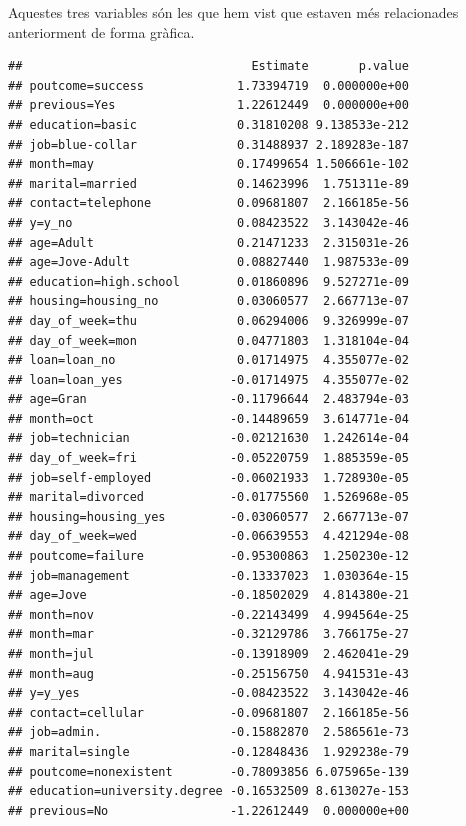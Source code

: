 \documentclass[
]{article}
\newenvironment{Shaded}{\begin{snugshade}}{\end{snugshade}}
\newcommand{\AttributeTok}[1]{\textcolor[rgb]{0.77,0.63,0.00}{#1}}
\newcommand{\NormalTok}[1]{#1}
\newcommand{\SpecialCharTok}[1]{\textcolor[rgb]{0.00,0.00,0.00}{#1}}
\newcommand{\StringTok}[1]{\textcolor[rgb]{0.31,0.60,0.02}{#1}}
\begin{document}
Aquestes tres variables són les que hem vist que estaven més
relacionades anteriorment de forma gràfica.

\begin{Shaded}
\end{Shaded}

\begin{verbatim}
##                                Estimate       p.value
## poutcome=success             1.73394719  0.000000e+00
## previous=Yes                 1.22612449  0.000000e+00
## education=basic              0.31810208 9.138533e-212
## job=blue-collar              0.31488937 2.189283e-187
## month=may                    0.17499654 1.506661e-102
## marital=married              0.14623996  1.751311e-89
## contact=telephone            0.09681807  2.166185e-56
## y=y_no                       0.08423522  3.143042e-46
## age=Adult                    0.21471233  2.315031e-26
## age=Jove-Adult               0.08827440  1.987533e-09
## education=high.school        0.01860896  9.527271e-09
## housing=housing_no           0.03060577  2.667713e-07
## day_of_week=thu              0.06294006  9.326999e-07
## day_of_week=mon              0.04771803  1.318104e-04
## loan=loan_no                 0.01714975  4.355077e-02
## loan=loan_yes               -0.01714975  4.355077e-02
## age=Gran                    -0.11796644  2.483794e-03
## month=oct                   -0.14489659  3.614771e-04
## job=technician              -0.02121630  1.242614e-04
## day_of_week=fri             -0.05220759  1.885359e-05
## job=self-employed           -0.06021933  1.728930e-05
## marital=divorced            -0.01775560  1.526968e-05
## housing=housing_yes         -0.03060577  2.667713e-07
## day_of_week=wed             -0.06639553  4.421294e-08
## poutcome=failure            -0.95300863  1.250230e-12
## job=management              -0.13337023  1.030364e-15
## age=Jove                    -0.18502029  4.814380e-21
## month=nov                   -0.22143499  4.994564e-25
## month=mar                   -0.32129786  3.766175e-27
## month=jul                   -0.13918909  2.462041e-29
## month=aug                   -0.25156750  4.941531e-43
## y=y_yes                     -0.08423522  3.143042e-46
## contact=cellular            -0.09681807  2.166185e-56
## job=admin.                  -0.15882870  2.586561e-73
## marital=single              -0.12848436  1.929238e-79
## poutcome=nonexistent        -0.78093856 6.075965e-139
## education=university.degree -0.16532509 8.613027e-153
## previous=No                 -1.22612449  0.000000e+00
\end{verbatim}
\end{document}
